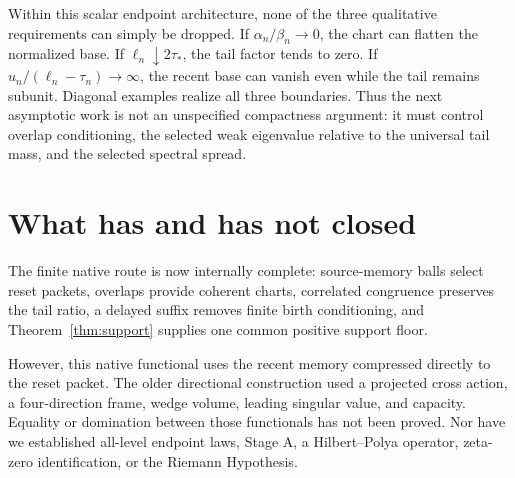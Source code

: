 \documentclass[12pt]{article}
\begin{document}
Within this scalar endpoint architecture, none of the three qualitative
requirements can simply be dropped.  If $\alpha_n/\beta_n\to0$, the chart
can flatten the normalized base.  If $\ell_n\downarrow2\tau_*$, the tail
factor tends to zero.  If $u_n/(\ell_n-\tau_n)\to\infty$, the recent base can
vanish even while the tail remains subunit.  Diagonal examples realize all
three boundaries.  Thus the next asymptotic work is not an unspecified
compactness argument: it must control overlap conditioning, the selected
weak eigenvalue relative to the universal tail mass, and the selected
spectral spread.

\section{What has and has not closed}
The finite native route is now internally complete: source-memory balls
select reset packets, overlaps provide coherent charts, correlated
congruence preserves the tail ratio, a delayed suffix removes finite birth
conditioning, and Theorem~\ref{thm:support} supplies one common positive
support floor.

However, this native functional uses the recent memory compressed directly
to the reset packet.  The older directional construction used a projected
cross action, a four-direction frame, wedge volume, leading singular value,
and capacity.  Equality or domination between those functionals has not been
proved.  Nor have we established all-level endpoint laws, Stage A, a
Hilbert--Polya operator, zeta-zero identification, or the Riemann Hypothesis.



\end{document}
